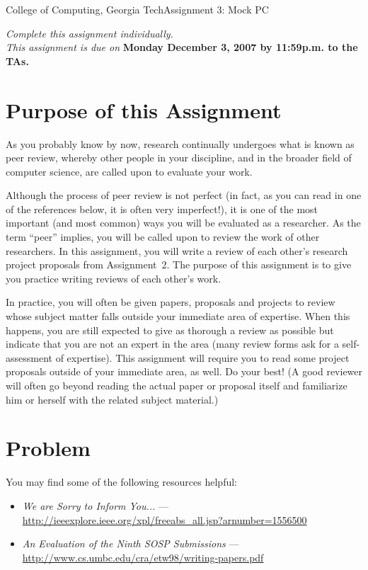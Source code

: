 \documentclass[11pt]{article}
\begin{document}


{College of Computing, Georgia Tech}{Assignment 3: Mock PC}

{\em Complete this assignment individually. \\  This
  assignment is due on} {\bf Monday December 3, 2007 by 11:59p.m. to
  the TAs.}

\section{Purpose of this Assignment}



As you probably know by now, research continually undergoes what is
known as peer review, whereby other people in your discipline, and in
the broader field of computer science, are called upon to evaluate your
work.  

Although the process of peer review is not perfect (in fact, as you can
read in one of the references below, it is often very imperfect!), it is
one of the most important (and most common) ways you will be evaluated
as a researcher.  As the term ``peer'' implies, you will be called upon
to review the work of other researchers.  In this assignment, you will
write a review of each other's research project proposals from
Assignment~2.  The purpose of this assignment is to give you practice
writing reviews of each other's work.

In practice, you will often be given papers, proposals and projects to
review whose subject matter falls outside your immediate area of
expertise.  When this happens, you are still expected to give as
thorough a review as possible but indicate that you are not an expert in
the area (many review forms ask for a self-assessment of expertise).
This assignment will require you to read some project proposals outside
of your immediate area, as well.  Do your best!  (A good reviewer will
often go beyond reading the actual paper or proposal itself and
familiarize him or herself with the related subject material.)

\section{Problem}



You may find some of the following resources helpful:

\begin{itemize}
\itemsep=-1pt
\item {\em We are Sorry to Inform You...} --- \\
  \url{http://ieeexplore.ieee.org/xpl/freeabs_all.jsp?arnumber=1556500}
\item {\em An Evaluation of the Ninth SOSP Submissions} --- \\
  \url{http://www.cs.umbc.edu/cra/etw98/writing-papers.pdf}
\end{itemize}
\end{document}
